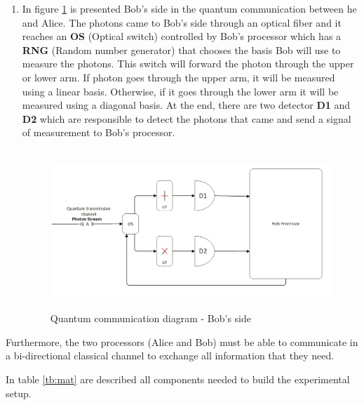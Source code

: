 \begin{enumerate}
  \item In figure \ref{quantumchannelcommunication2} is presented Bob's side in the quantum communication between he and Alice. The photons came to Bob's side through an optical fiber and it reaches an \textbf{OS} (Optical switch) controlled by Bob's processor which has a \textbf{RNG} (Random number generator) that chooses the basis Bob will use to measure the photons. This switch will forward the photon through the upper or lower arm. If photon goes through the upper arm, it will be measured using a linear basis. Otherwise, if it goes through the lower arm it will be measured using a diagonal basis. At the end, there are two detector \textbf{D1} and \textbf{D2} which are responsible to detect the photons that came and send a signal of measurement to Bob's processor.

        \begin{figure}[H]
        	\centering \includegraphics[width=1.0\textwidth,height=6cm]{./sdf/ot_with_discrete_variables/figures/experimental_bob.png}
        	\caption{Quantum communication diagram - Bob's side}\label{quantumchannelcommunication2}
        \end{figure}

\end{enumerate}

Furthermore, the two processors (Alice and Bob) must be able to communicate in a bi-directional classical channel to exchange all information that they need.

In table \ref{tb:mat} are described all components needed to build the experimental setup.

